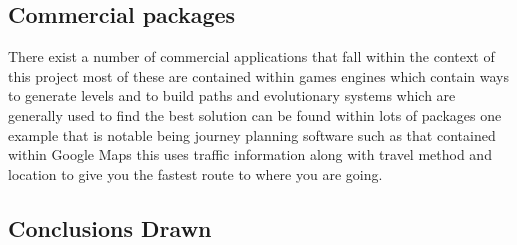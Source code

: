 \subsection{Commercial packages}
There exist a number of commercial applications that fall within the context of this project most of these are contained within  games engines which contain ways to generate levels and to build paths and evolutionary systems which are generally used to find the best solution can be found within lots of packages one example that is notable being journey planning software such as that contained within Google Maps this uses traffic information along with travel method and location to give you the fastest route to where you are going. 

\subsection{Conclusions Drawn}
\pagebreak

